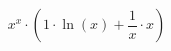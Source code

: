 \documentclass{report}
\begin{document}
$$x ^{x}  \cdot (1 \cdot  \ln (x)  +  \frac{1}{x}  \cdot x)$$
\end{document}
